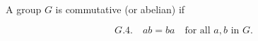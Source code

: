 A group $G$ is commutative (or abelian) if

$$G.4.\quad ab = ba \quad \text{for all } a, b \text{ in } G.$$
